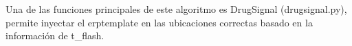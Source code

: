 \documentclass[../00_Main.tex]{subfiles}
\begin{document}
Una de las funciones principales de este algoritmo es DrugSignal (drugsignal.py), permite inyectar el erptemplate en las ubicaciones correctas basado en la información de t_flash. 

\biblio %
\end{document}
